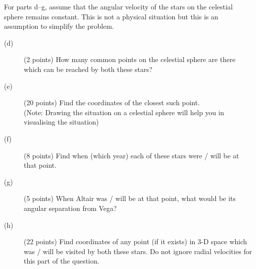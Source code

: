 For parts d--g, assume that the angular velocity of the stars on the celestial
sphere remains constant. This is not a physical situation but this is an
assumption to simplify the problem.

\begin{description}
\item[(d)] (2 points) How many common points on the celestial sphere are there
  which can be reached by both these stars?
\item[(e)] (20 points) Find the coordinates of the closest such point.\\
  (Note: Drawing the situation on a celestial sphere will help you in
  visualising the situation)
\item[(f)] (8 points) Find when (which year) each of these stars were / will be
  at that point.
\item[(g)] (5 points) When Altair was / will be at that point, what would be
  its angular separation from Vega?
\item[(h)] (22 points) Find coordinates of any point (if it exists) in 3-D
  space which was / will be visited by both these stars. Do not ignore radial
  velocities for this part of the question.
\end{description}
